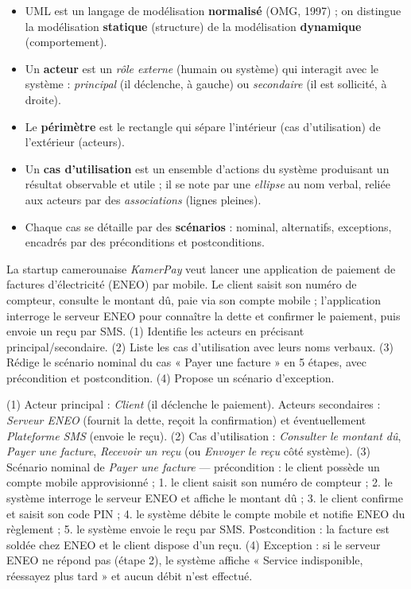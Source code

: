 \documentclass[11pt]{article}
\begin{document}
\begin{aretenir}
\begin{itemize}
\item UML est un langage de modélisation \textbf{normalisé} (OMG, 1997) ; on distingue la modélisation \textbf{statique} (structure) de la modélisation \textbf{dynamique} (comportement).
\item Un \textbf{acteur} est un \emph{rôle externe} (humain ou système) qui interagit avec le système : \emph{principal} (il déclenche, à gauche) ou \emph{secondaire} (il est sollicité, à droite).
\item Le \textbf{périmètre} est le rectangle qui sépare l'intérieur (cas d'utilisation) de l'extérieur (acteurs).
\item Un \textbf{cas d'utilisation} est un ensemble d'actions du système produisant un résultat observable et utile ; il se note par une \emph{ellipse} au nom verbal, reliée aux acteurs par des \emph{associations} (lignes pleines).
\item Chaque cas se détaille par des \textbf{scénarios} : nominal, alternatifs, exceptions, encadrés par des préconditions et postconditions.
\end{itemize}
\end{aretenir}

\begin{exercice}
La startup camerounaise \emph{KamerPay} veut lancer une application de paiement de factures d'électricité (ENEO) par mobile. Le client saisit son numéro de compteur, consulte le montant dû, paie via son compte mobile ; l'application interroge le serveur ENEO pour connaître la dette et confirmer le paiement, puis envoie un reçu par SMS. (1) Identifie les acteurs en précisant principal/secondaire. (2) Liste les cas d'utilisation avec leurs noms verbaux. (3) Rédige le scénario nominal du cas « Payer une facture » en 5 étapes, avec précondition et postcondition. (4) Propose un scénario d'exception.
\end{exercice}

\begin{corrige}
(1) Acteur principal : \emph{Client} (il déclenche le paiement). Acteurs secondaires : \emph{Serveur ENEO} (fournit la dette, reçoit la confirmation) et éventuellement \emph{Plateforme SMS} (envoie le reçu). (2) Cas d'utilisation : \emph{Consulter le montant dû}, \emph{Payer une facture}, \emph{Recevoir un reçu} (ou \emph{Envoyer le reçu} côté système). (3) Scénario nominal de \emph{Payer une facture} — précondition : le client possède un compte mobile approvisionné ; 1. le client saisit son numéro de compteur ; 2. le système interroge le serveur ENEO et affiche le montant dû ; 3. le client confirme et saisit son code PIN ; 4. le système débite le compte mobile et notifie ENEO du règlement ; 5. le système envoie le reçu par SMS. Postcondition : la facture est soldée chez ENEO et le client dispose d'un reçu. (4) Exception : si le serveur ENEO ne répond pas (étape 2), le système affiche « Service indisponible, réessayez plus tard » et aucun débit n'est effectué.
\end{corrige}
\end{document}
